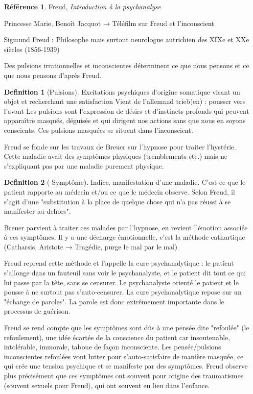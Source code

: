 \documentclass[french]{book}
\theoremstyle{definition}
\newtheorem*{dfn}{Definition}
\newtheorem*{refe}{Référence}
\begin{document}
\begin{refe}
	Freud, \textit{Introduction à la psychanalyse}
\end{refe}

Princesse Marie, Benoît Jacquot → Téléfilm sur Freud et l'inconscient

Sigmund Freud : Philosophe mais surtout neurologue autrichien des XIXe et XXe siècles (1856-1939)

Des pulsions irrationnelles et inconscientes déterminent ce que nous pensons et ce que nous pensons d'après Freud.

\begin{dfn}[Pulsions]
	Excitations psychiques d'origine somatique visant un objet et recherchant une satisfaction 
Vient de l'allemand trieb(en) : pousser vers l'avant
Les pulsions sont l'expression de désirs et d'instincts profonds qui peuvent apparaître masqués, déguisés et qui dirigent nos actions sans que nous en soyons conscients. Ces pulsions masquées se situent dans l'inconscient.
\end{dfn}


Freud se fonde sur les travaux de Breuer sur l'hypnose pour traiter l'hystérie. Cette maladie avait des symptômes physiques (tremblements etc.) mais ne s'expliquant pas par une maladie purement physique.

\begin{dfn}[ Symptôme]
	Indice, manifestation d'une maladie. C'est ce que le patient rapporte au médecin et/ou ce que le médecin observe.
Selon Freud, il s'agit d'une "substitution à la place de quelque chose qui n'a pas réussi à se manifester au-dehors".
\end{dfn}


Breuer parvient à traiter ces malades par l'hypnose, en revient l'émotion associée à ces symptômes. Il y a une décharge émotionnelle, c'est la méthode cathartique (Catharsis, Aristote → Tragédie, purge le mal par le mal)

Freud reprend cette méthode et l'appelle la cure psychanalytique : le patient s'allonge dans un fauteuil sans voir le psychanalyste, et le patient dit tout ce qui lui passe par la tête, sans se censurer. Le psychanalyste orienté le patient et le pousse à ne surtout pas s'auto-censurer. La cure psychanalytique repose sur un "échange de paroles". La parole est donc extrêmement importante dans le processus de guérison.

Freud se rend compte que les symptômes sont dûs à une pensée dite "refoulée" (le refoulement), une idée écartée de la conscience du patient car insoutenable, intolérable, immorale, taboue de façon inconsciente. Les pensée/pulsions inconscientes refoulées vont lutter pour s'auto-satisfaire de manière masquée, ce qui crée une tension psychique et se manifeste par des symptômes. Freud observe plus précisément que ces symptômes ont souvent pour origine des traumatismes (souvent sexuels pour Freud), qui ont souvent eu lieu dans l'enfance.
\end{document}
